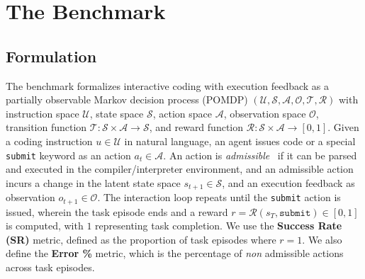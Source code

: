 \section{The \benchmark{} Benchmark}
\label{sec:benchmark}


\subsection{Formulation}
\label{sec:benchmark:formulation}

The \benchmark{} benchmark formalizes interactive coding with execution feedback as a partially observable Markov decision process (POMDP) $(\mathcal{U}, \mathcal{S}, \mathcal{A}, \mathcal{O}, \mathcal{T}, \mathcal{R})$ with instruction space $\mathcal{U}$, state space $\mathcal{S}$, action space $\mathcal{A}$, observation space $\mathcal{O}$, transition function $\mathcal{T}: \mathcal{S} \times \mathcal{A} \to \mathcal{S}$, and reward function $\mathcal{R}: \mathcal{S} \times \mathcal{A} \to [0, 1]$.
Given a  coding instruction $u \in \mathcal{U}$ in natural language, an agent issues code or a special \texttt{submit} keyword as an action $a_t \in \mathcal{A}$.
An action is \textit{admissible}~\cite{yao2020calm} if it can be parsed and executed in the compiler/interpreter environment, and an admissible action incurs a change in the latent state space $s_{t+1} \in \mathcal{S}$, and an execution feedback as observation $o_{t+1} \in \mathcal{O}$.
The interaction loop repeats until the \texttt{submit} action is issued, wherein the task episode ends and a reward $r = \mathcal{R}(s_T, \texttt{submit}) \in [0, 1]$ is computed, with $1$ representing task completion. 
We use the \textbf{Success Rate (SR)} metric, defined as the proportion of task episodes where $r = 1$.
We also define the \textbf{Error \%} metric, which is the percentage of \textit{non} admissible actions across  task episodes.



